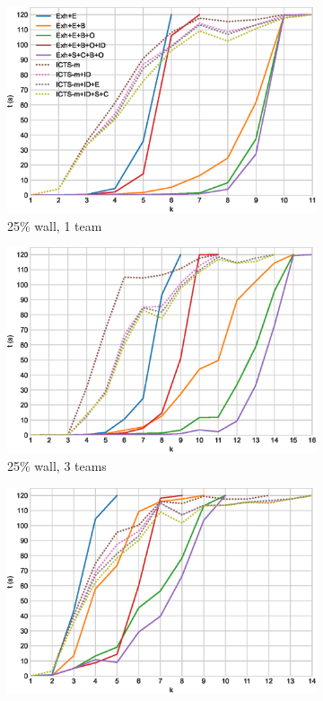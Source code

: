 \documentclass[english,10pt]{article}
\begin{document}
	\printbibliography
	\begin{figure}[t]
		\centering
		\begin{subfigure}{0.44\textwidth}
			\centering
			\includegraphics[width=\linewidth]{img/results/icts-comparison/25-1}
			\caption{25\% wall, 1 team}
			\label{fig:i-25-1}
		\end{subfigure}
		\begin{subfigure}{0.44\textwidth}
			\centering
			\includegraphics[width=\linewidth]{img/results/icts-comparison/25-3}
			\caption{25\% wall, 3 teams}
			\label{fig:i-25-3}
		\end{subfigure}
		\begin{subfigure}{0.44\textwidth}
			\centering
			\includegraphics[width=\linewidth]{img/results/icts-comparison/75-1}

\end{subfigure}
\end{figure}
\end{document}
